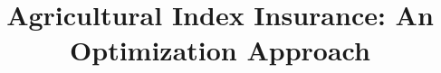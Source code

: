 \documentclass[12pt]{article}
\def\EMAIL#1{\href{mailto:#1}{#1}}%
\def\URL#1{\href{#1}{#1}}         %
\begin{document}




\vspace{-5ex}
\title{Agricultural Index Insurance: An Optimization Approach}





\maketitle



\end{document}
